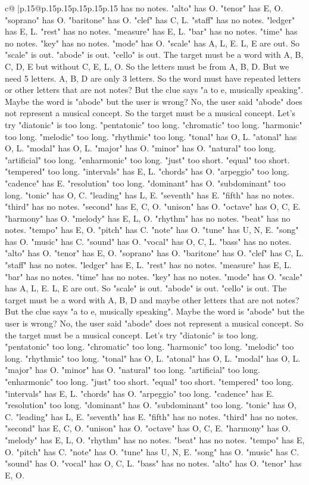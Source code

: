 \documentclass{article}
\begin{document}
{\begin{supertabular}{c@{$\;$}|p{.15\linewidth}@{}p{.15\linewidth}p{.15\linewidth}p{.15\linewidth}p{.15\linewidth}p{.15\linewidth}}
{{{has no notes. "alto" has O. "tenor" has E, O. "soprano" has O. "baritone" has O. "clef" has C, L. "staff" has no notes. "ledger" has E, L. "rest" has no notes. "measure" has E, L. "bar" has no notes. "time" has no notes. "key" has no notes. "mode" has O. "scale" has A, L, E. L, E are out. So "scale" is out. "abode" is out. "cello" is out. The target must be a word with A, B, C, D, E but without C, E, L, O. So the letters must be from A, B, D. But we need 5 letters. A, B, D are only 3 letters. So the word must have repeated letters or other letters that are not notes? But the clue says "a to e, musically speaking". Maybe the word is "abode" but the user is wrong? No, the user said "abode" does not represent a musical concept. So the target must be a musical concept. Let's try "diatonic" is too long. "pentatonic" too long. "chromatic" too long. "harmonic" too long. "melodic" too long. "rhythmic" too long. "tonal" has O, L. "atonal" has O, L. "modal" has O, L. "major" has O. "minor" has O. "natural" too long. "artificial" too long. "enharmonic" too long. "just" too short. "equal" too short. "tempered" too long. "intervals" has E, L. "chords" has O. "arpeggio" too long. "cadence" has E. "resolution" too long. "dominant" has O. "subdominant" too long. "tonic" has O, C. "leading" has L, E. "seventh" has E. "fifth" has no notes. "third" has no notes. "second" has E, C, O. "unison" has O. "octave" has O, C, E. "harmony" has O. "melody" has E, L, O. "rhythm" has no notes. "beat" has no notes. "tempo" has E, O. "pitch" has C. "note" has O. "tune" has U, N, E. "song" has O. "music" has C. "sound" has O. "vocal" has O, C, L. "bass" has no notes. "alto" has O. "tenor" has E, O. "soprano" has O. "baritone" has O. "clef" has C, L. "staff" has no notes. "ledger" has E, L. "rest" has no notes. "measure" has E, L. "bar" has no notes. "time" has no notes. "key" has no notes. "mode" has O. "scale" has A, L, E. L, E are out. So "scale" is out. "abode" is out. "cello" is out. The target must be a word with A, B, D and maybe other letters that are not notes? But the clue says "a to e, musically speaking". Maybe the word is "abode" but the user is wrong? No, the user said "abode" does not represent a musical concept. So the target must be a musical concept. Let's try "diatonic" is too long. "pentatonic" too long. "chromatic" too long. "harmonic" too long. "melodic" too long. "rhythmic" too long. "tonal" has O, L. "atonal" has O, L. "modal" has O, L. "major" has O. "minor" has O. "natural" too long. "artificial" too long. "enharmonic" too long. "just" too short. "equal" too short. "tempered" too long. "intervals" has E, L. "chords" has O. "arpeggio" too long. "cadence" has E. "resolution" too long. "dominant" has O. "subdominant" too long. "tonic" has O, C. "leading" has L, E. "seventh" has E. "fifth" has no notes. "third" has no notes. "second" has E, C, O. "unison" has O. "octave" has O, C, E. "harmony" has O. "melody" has E, L, O. "rhythm" has no notes. "beat" has no notes. "tempo" has E, O. "pitch" has C. "note" has O. "tune" has U, N, E. "song" has O. "music" has C. "sound" has O. "vocal" has O, C, L. "bass" has no notes. "alto" has O. "tenor" has E, O. }}}
\end{supertabular}}
\end{document}
